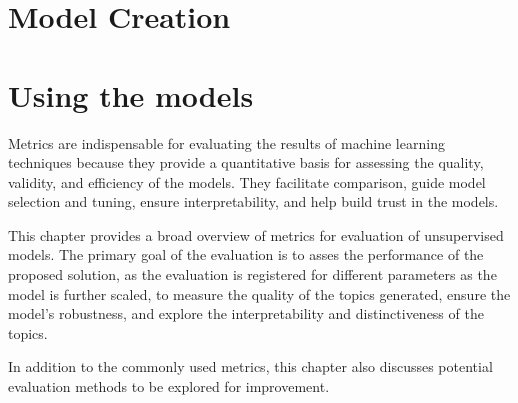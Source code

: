 \section{Model Creation}
\section{Using the models}



Metrics are indispensable for evaluating the results of machine learning techniques because they provide a quantitative basis for assessing the quality, validity, and efficiency of the models. They facilitate comparison, guide model selection and tuning, ensure interpretability, and help build trust in the models. 

This chapter provides a broad overview of metrics for evaluation of unsupervised models. The primary goal of the evaluation is to asses the performance of the proposed solution, as the evaluation is registered for different parameters as the model is further scaled, to measure the quality of the topics generated, ensure the model's robustness, and explore the interpretability and distinctiveness of the topics. 


In addition to the commonly used metrics, this chapter also discusses potential evaluation methods to be explored for improvement.



